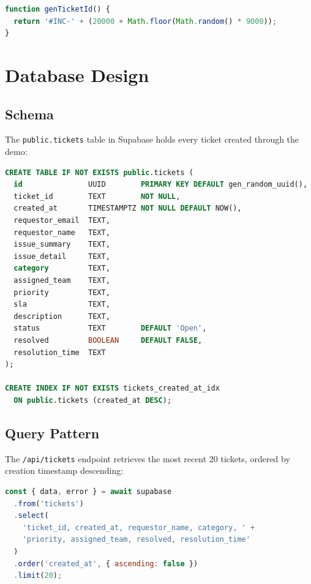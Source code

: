 \documentclass[12pt, a4paper]{article}
\newcommand{\inlinecode}[1]{%
  \colorbox{inlinecode!20}{\texttt{\small #1}}%
}
\begin{document}
\begin{lstlisting}[language=JavaScript, caption={Ticket ID generator}]
function genTicketId() {
  return '#INC-' + (20000 + Math.floor(Math.random() * 9000));
}
\end{lstlisting}

\section{Database Design}

\subsection{Schema}

The \inlinecode{public.tickets} table in Supabase holds every ticket created through the
demo:

\begin{lstlisting}[language=SQL, caption={Supabase schema (supabase/schema.sql)}]
CREATE TABLE IF NOT EXISTS public.tickets (
  id               UUID        PRIMARY KEY DEFAULT gen_random_uuid(),
  ticket_id        TEXT        NOT NULL,
  created_at       TIMESTAMPTZ NOT NULL DEFAULT NOW(),
  requestor_email  TEXT,
  requestor_name   TEXT,
  issue_summary    TEXT,
  issue_detail     TEXT,
  category         TEXT,
  assigned_team    TEXT,
  priority         TEXT,
  sla              TEXT,
  description      TEXT,
  status           TEXT        DEFAULT 'Open',
  resolved         BOOLEAN     DEFAULT FALSE,
  resolution_time  TEXT
);

CREATE INDEX IF NOT EXISTS tickets_created_at_idx
  ON public.tickets (created_at DESC);
\end{lstlisting}

\subsection{Query Pattern}

The \inlinecode{/api/tickets} endpoint retrieves the most recent 20 tickets, ordered by
creation timestamp descending:

\begin{lstlisting}[language=JavaScript, caption={Ticket table query}]
const { data, error } = await supabase
  .from('tickets')
  .select(
    'ticket_id, created_at, requestor_name, category, ' +
    'priority, assigned_team, resolved, resolution_time'
  )
  .order('created_at', { ascending: false })
  .limit(20);
\end{lstlisting}
\end{document}
